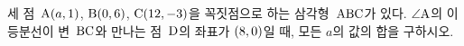 세 점~$\mathrm{A}(a{,}\mkern3mu\mathopen{}1)$, $\mathrm{B}(0{,}\mkern3mu\mathopen{}6)$, $\mathrm{C}(12{,}\mkern3mu\mathopen{}-3)$을 꼭짓점으로 하는 삼각형~$\mathrm{ABC}$가 있다. $\angle\mathrm{A}$의 이등분선이 변~$\mathrm{BC}$와 만나는 점~$\mathrm{D}$의 좌표가 $(8{,}\mkern3mu\mathopen{}0)$일 때, 모든 $a$의 값의 합을 구하시오.
